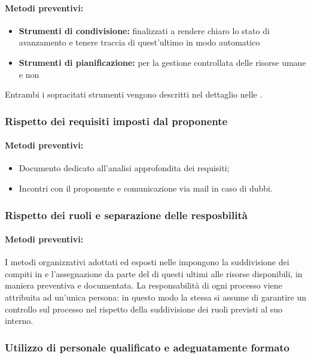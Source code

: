 \documentclass[12pt,a4paper]{article}
\begin{document}
\paragraph{Metodi preventivi:}
\begin{itemize}
	\item \textbf{Strumenti di condivisione:} finalizzati a rendere chiaro lo stato di avanzamento e tenere traccia di quest'ultimo in modo automatico
	\item \textbf{Strumenti di pianificazione:} per la gestione controllata delle risorse umane e non
\end{itemize}
Entrambi i sopracitati strumenti vengono descritti nel dettaglio nelle \NdP{}.

\subsubsection{Rispetto dei requisiti imposti dal proponente \Zucchetti{}}
\paragraph{Metodi preventivi:}
\begin{itemize}
	\item Documento dedicato all'analisi approfondita dei requisiti;
	\item Incontri con il proponente e comunicazione via mail in caso di dubbi.
\end{itemize}

\subsubsection{Rispetto dei ruoli e separazione delle resposbilità}
\paragraph{Metodi preventivi:}
I metodi organizzativi adottati ed esposti nelle \NdP{} impongono la suddivisione dei compiti in  e l'assegnazione da parte del \PM{} di questi ultimi alle risorse disponibili, in maniera preventiva e documentata. 
La responsabilità di ogni processo viene attribuita ad un'unica persona: in questo modo la stessa si assume di garantire un controllo sul processo nel rispetto della suddivisione dei ruoli previsti al suo interno.

\subsubsection{Utilizzo di personale qualificato e adeguatamente formato}
\end{document}
